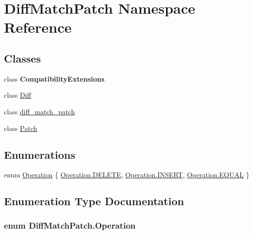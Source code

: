 \hypertarget{namespace_diff_match_patch}{}\section{Diff\+Match\+Patch Namespace Reference}
\label{namespace_diff_match_patch}
\subsection*{Classes}
\begin{DoxyCompactItemize}
\item 
class {\bfseries Compatibility\+Extensions}
\item 
class \hyperlink{class_diff_match_patch_1_1_diff}{Diff}
\item 
class \hyperlink{class_diff_match_patch_1_1diff__match__patch}{diff\+\_\+match\+\_\+patch}
\item 
class \hyperlink{class_diff_match_patch_1_1_patch}{Patch}
\end{DoxyCompactItemize}
\subsection*{Enumerations}
\begin{DoxyCompactItemize}
\item 
enum \hyperlink{namespace_diff_match_patch_ad70dddf4b74fd84a225659bb55739feb}{Operation} \{ \hyperlink{namespace_diff_match_patch_ad70dddf4b74fd84a225659bb55739feba32f68a60cef40faedbc6af20298c1a1e}{Operation.\+D\+E\+L\+E\+T\+E}, 
\hyperlink{namespace_diff_match_patch_ad70dddf4b74fd84a225659bb55739feba61ee777e7f71dc466c3b2c685d8d313b}{Operation.\+I\+N\+S\+E\+R\+T}, 
\hyperlink{namespace_diff_match_patch_ad70dddf4b74fd84a225659bb55739feba969f331a87d8c958473c32b4d0e61a44}{Operation.\+E\+Q\+U\+A\+L}
 \}
\end{DoxyCompactItemize}


\subsection{Enumeration Type Documentation}
\hypertarget{namespace_diff_match_patch_ad70dddf4b74fd84a225659bb55739feb}{}
\subsubsection[{Operation}]{\setlength{\rightskip}{0pt plus 5cm}enum {\bf Diff\+Match\+Patch.\+Operation}\hspace{0.3cm}{\ttfamily [strong]}}\label{namespace_diff_match_patch_ad70dddf4b74fd84a225659bb55739feb}

